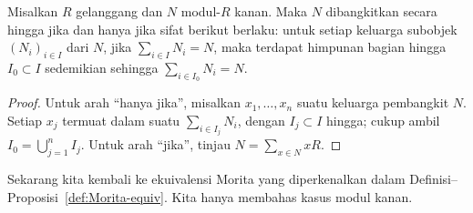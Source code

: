 
\begin{lemma}\label{prop:fg-module-cat}
	Misalkan $R$ gelanggang dan $N$ modul-$R$ kanan. Maka $N$ dibangkitkan
	secara hingga jika dan hanya jika sifat berikut berlaku: untuk setiap
	keluarga subobjek $(N_i)_{i \in I}$ dari $N$, jika
	$\sum_{i \in I}N_i=N$, maka terdapat himpunan bagian hingga
	$I_0\subset I$ sedemikian sehingga $\sum_{i \in I_0}N_i=N$.
\end{lemma}
\begin{proof}
	Untuk arah ``hanya jika'', misalkan $x_1,\ldots,x_n$ suatu keluarga
	pembangkit $N$. Setiap $x_j$ termuat dalam suatu
	$\sum_{i\in I_j}N_i$, dengan $I_j\subset I$ hingga; cukup ambil
	$I_0=\bigcup_{j=1}^n I_j$. Untuk arah ``jika'', tinjau
	$N=\sum_{x\in N}xR$.
\end{proof}

Sekarang kita kembali ke ekuivalensi Morita yang diperkenalkan dalam
Definisi--Proposisi~\ref{def:Morita-equiv}. Kita hanya membahas kasus modul
kanan.

